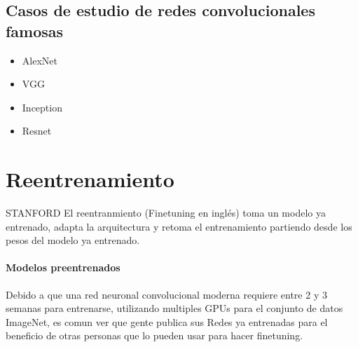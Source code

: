 \documentclass[a4paper,11pt,spanish]{book}
\begin{document}
    \subsection {Casos de estudio de redes convolucionales famosas}
      \begin{itemize}
	\item AlexNet
	\item VGG
	\item Inception
	\item Resnet
      \end{itemize}

    \section {Reentrenamiento}
    STANFORD
      El reentranmiento (Finetuning en inglés) toma un modelo ya entrenado, adapta la arquitectura y retoma el entrenamiento partiendo desde los pesos del modelo ya entrenado.
      \paragraph{Modelos preentrenados}
	Debido a que una red neuronal convolucional moderna requiere entre 2 y 3 semanas para entrenarse, utilizando multiples GPUs para el conjunto de datos ImageNet, es comun ver que gente
	publica sus Redes ya entrenadas para el beneficio de otras personas que lo pueden usar para hacer finetuning.
\end{document}
